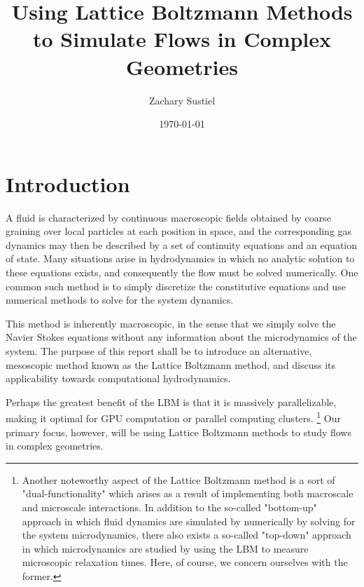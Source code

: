 \documentclass[a4paper]{article}
\title{Using Lattice Boltzmann Methods to Simulate Flows in Complex Geometries}
\author{Zachary Sustiel}
\date{\today}
\begin{document}
\maketitle


\section{Introduction}
A fluid is characterized by continuous macroscopic fields obtained by coarse graining over local particles at each position in space, and the corresponding gas dynamics may then be described by a set of continuity equations and an equation of state. Many situations arise in hydrodynamics in which no analytic solution to these equations exists, and consequently the flow must be solved numerically. One common such method is to simply discretize the constitutive equations and use numerical methods to solve for the system dynamics.

This method is inherently macroscopic, in the sense that we simply solve the Navier Stokes equations without any information about the microdynamics of the system. The purpose of this report shall be to introduce an alternative, mesoscopic method known as the Lattice Boltzmann method, and discuss its applicability towards computational hydrodynamics. 

Perhaps the greatest benefit of the LBM is that it is massively parallelizable, making it optimal for GPU computation or parallel computing clusters. \footnote{Another noteworthy aspect of the Lattice Boltzmann method is a sort of "dual-functionality" which arises as a result of implementing both macroscale and microscale interactions. In addition to the so-called "bottom-up" approach in which fluid dynamics are simulated by numerically by solving for the system microdynamics,  there also exists a so-called "top-down" approach in which microdynamics are studied by using the LBM to measure microscopic relaxation times. \cite{latticehistory} Here, of course, we concern ourselves with the former.} Our primary focus, however, will be using Lattice Boltzmann methods to study flows in complex geometries.
\end{document}
